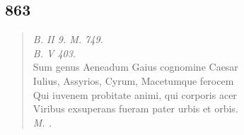 \documentclass[11pt, a4paper]{report}
\begin{document}
            \subsection*{863}
      \begin{verse}
      \textit{B. II 9. M. 749.} \\ \textit{B. V 403.} \\ Sum genus Aeneadum Gaius cognomine Caesar \\ Iulius, Assyrios, Cyrum, Macetumque ferocem \\ Qui iuvenem probitate animi, qui corporis acer \\ Viribus exsuperans fueram pater urbis et orbis. \\ \textit{M. .} \\ 
      \end{verse}
  
\end{document}
